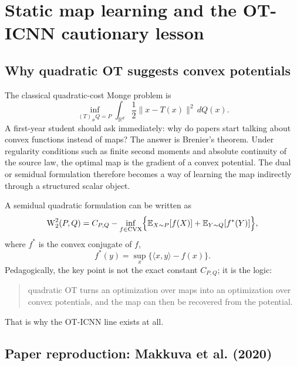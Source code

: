 \documentclass[11pt]{report}
\newcommand{\R}{\mathbb{R}}
\newcommand{\E}{\mathbb{E}}
\newcommand{\W}{\operatorname{W}}
\newcommand{\pushf}[2]{\left(#1\right)_{\#} #2}
\begin{document}
\chapter{Static map learning and the OT-ICNN cautionary lesson}

\section{Why quadratic OT suggests convex potentials}

The classical quadratic-cost Monge problem is
\begin{equation}
\inf_{\pushf{T}{Q}=P} \int_{\R^d} \frac12\|x-T(x)\|^2\,dQ(x).
\label{eq:monge-problem}
\end{equation}
A first-year student should ask immediately: why do papers start talking about
convex functions instead of maps?  The answer is Brenier's theorem.  Under
regularity conditions such as finite second moments and absolute continuity of the
source law, the optimal map is the gradient of a convex potential.  The dual or
semidual formulation therefore becomes a way of learning the map indirectly through
a structured scalar object.

A semidual quadratic formulation can be written as
\begin{equation}
\W_2^2(P,Q)
=
C_{P,Q} - \inf_{f\in\mathrm{CVX}} \Bigl\{\E_{X\sim P}[f(X)] + \E_{Y\sim Q}[f^*(Y)]\Bigr\},
\label{eq:quadratic-semidual}
\end{equation}
where $f^*$ is the convex conjugate of $f$,
\begin{equation}
f^*(y)=\sup_x \{\langle x,y\rangle - f(x)\}.
\label{eq:convex-conjugate}
\end{equation}
Pedagogically, the key point is not the exact constant $C_{P,Q}$; it is the
logic:
\begin{quote}
quadratic OT turns an optimization over maps into an optimization over convex
potentials, and the map can then be recovered from the potential.
\end{quote}
That is why the OT-ICNN line exists at all.

\section{Paper reproduction: Makkuva et al. (2020)}
\end{document}
